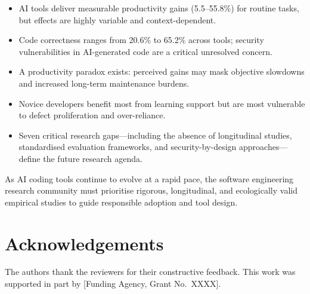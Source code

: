\documentclass[journal,twoside,10pt]{IEEEtran}
\begin{document}
\begin{itemize}
  \item AI tools deliver measurable productivity gains (5.5--55.8\%) for
        routine tasks, but effects are highly variable and context-dependent.
  \item Code correctness ranges from 20.6\% to 65.2\% across tools; security
        vulnerabilities in AI-generated code are a critical unresolved concern.
  \item A productivity paradox exists: perceived gains may mask objective
        slowdowns and increased long-term maintenance burdens.
  \item Novice developers benefit most from learning support but are most
        vulnerable to defect proliferation and over-reliance.
  \item Seven critical research gaps---including the absence of longitudinal
        studies, standardised evaluation frameworks, and security-by-design
        approaches---define the future research agenda.
\end{itemize}

As AI coding tools continue to evolve at a rapid pace, the software engineering
research community must prioritise rigorous, longitudinal, and ecologically
valid empirical studies to guide responsible adoption and tool design.

\section*{Acknowledgements}
The authors thank the reviewers for their constructive feedback. This work was
supported in part by [Funding Agency, Grant No.\ XXXX].



\end{document}

